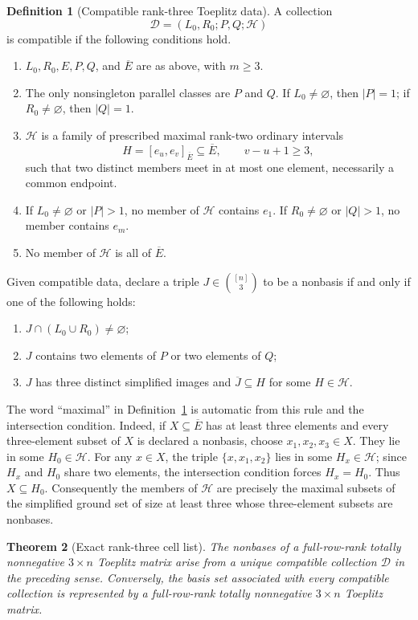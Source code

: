 \documentclass{amsart}
\numberwithin{equation}{section}
\newtheorem{theorem}{Theorem}
\theoremstyle{definition}
\newtheorem{definition}[theorem]{Definition}
\theoremstyle{remark}
\begin{document}
\begin{definition}[Compatible rank-three Toeplitz data]\label{def:compatible}
A collection
\[
 \mathcal D=(L_0,R_0;P,Q;\mathcal H)
\]
is compatible if the following conditions hold.
\begin{enumerate}
\item $L_0,R_0,E,P,Q$, and $\overline E$ are as above, with $m\ge3$.
\item The only nonsingleton parallel classes are $P$ and $Q$.  If $L_0\ne\varnothing$, then $|P|=1$; if $R_0\ne\varnothing$, then $|Q|=1$.
\item $\mathcal H$ is a family of prescribed maximal rank-two ordinary intervals
\[
 H=[e_u,e_v]_{\overline E}\subseteq\overline E,
 \qquad v-u+1\ge3,
\]
such that two distinct members meet in at most one element, necessarily a common endpoint.
\item If $L_0\ne\varnothing$ or $|P|>1$, no member of $\mathcal H$ contains $e_1$.  If $R_0\ne\varnothing$ or $|Q|>1$, no member contains $e_m$.
\item No member of $\mathcal H$ is all of $\overline E$.
\end{enumerate}
\end{definition}

Given compatible data, declare a triple $J\in\binom{[n]}3$ to be a nonbasis if and only if one of the following holds:
\begin{enumerate}
\item $J\cap(L_0\cup R_0)\ne\varnothing$;
\item $J$ contains two elements of $P$ or two elements of $Q$;
\item $J$ has three distinct simplified images and $\overline J\subseteq H$ for some $H\in\mathcal H$.
\end{enumerate}
The word ``maximal'' in Definition~\ref{def:compatible} is automatic from this rule and the intersection condition.  Indeed, if $X\subseteq\overline E$ has at least three elements and every three-element subset of $X$ is declared a nonbasis, choose $x_1,x_2,x_3\in X$.  They lie in some $H_0\in\mathcal H$.  For any $x\in X$, the triple $\{x,x_1,x_2\}$ lies in some $H_x\in\mathcal H$; since $H_x$ and $H_0$ share two elements, the intersection condition forces $H_x=H_0$.  Thus $X\subseteq H_0$.  Consequently the members of $\mathcal H$ are precisely the maximal subsets of the simplified ground set of size at least three whose three-element subsets are nonbases.

\begin{theorem}[Exact rank-three cell list]\label{thm:rank3-list}
The nonbases of a full-row-rank totally nonnegative $3\times n$ Toeplitz matrix arise from a unique compatible collection $\mathcal D$ in the preceding sense.  Conversely, the basis set associated with every compatible collection is represented by a full-row-rank totally nonnegative $3\times n$ Toeplitz matrix.
\end{theorem}
\end{document}
